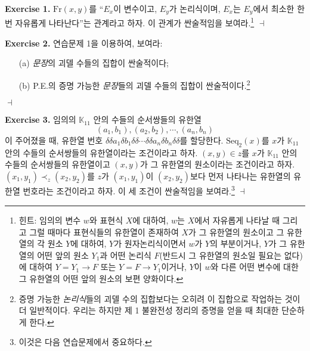 \documentclass[12pt]{paper}
\newenvironment{context}[1][]
{ \noindent \textbf{{#1}.} }
{ \hfill $ \dashv $ }
\begin{document}
\begin{context}[Exercise 1]
$\mathrm{Fr} \left( x , y \right)$를 ``$E_x$이 변수이고, $E_y$가 논리식이며, $E_x$는 $E_y$에서 최소한 한 번 자유롭게 나타난다''는 관계라고 하자.
이 관계가 싼술적임을 보여라.\footnote
{
힌트: 임의의 변수 $w$와 표현식 $X$에 대하여,
$w$는 $X$에서 자유롭게 나타날 때 그리고 그럴 때마다
표현식들의 유한열이 존재하여 $X$가 그 유한열의 원소이고 그 유한열의 각 원소 $Y$에 대하여,
$Y$가 원자논리식이면서 $w$가 $Y$의 부분이거나,
$Y$가 그 유한열의 어떤 앞의 원소 $Y_1$과 어떤 논리식 $F$(반드시 그 유한열의 원소일 필요는 없다)에 대하여 $Y = Y_1 \rightarrow F$ 또는 $Y = F \rightarrow Y_1$이거나,
$Y$이 $w$와 다른 어떤 변수에 대한 그 유한열의 어떤 앞의 원소의 보편 양화이다.
}
\end{context}

\begin{context}[Exercise 2]
연습문제 1을 이용하여, 보여라:
\begin{enumerate}
\item[(a)] \textit{문장}의 괴델 수들의 집합이 싼술적이다;
\item[(b)] P.E.의 증명 가능한 \textit{문장}들의 괴델 수들의 집합이 싼술적이다.\footnote
{
증명 가능한 \textit{논리식}들의 괴델 수의 집합보다는 오히려 이 집합으로 작업하는 것이 더 일반적이다.
우리는 하지만 제 1 불완전성 정리의 증명을 얻을 때 최대한 단순하게 한다.
}
\end{enumerate}
\end{context}

\begin{context}[Exercise 3]
임의의 $\mathbb{K}_{11}$ 안의 수들의 순서쌍들의 유한열 $$\left( a_1 , b_1 \right) , \left( a_2 , b_2 \right) , \cdots , \left( a_n , b_n \right)$$이 주어졌을 때,
유한열 번호 $\delta \delta a_1 \delta b_1 \delta\delta \cdots \delta \delta a_n \delta b_n \delta \delta$를 할당한다.
$\mathrm{Seq}_2 \left( x \right)$를 $x$가 $\mathbb{K}_{11}$ 안의 수들의 순서쌍들의 유한열이라는 조건이라고 하자.
$ \left( x , y \right) \in z $를 $x$가 $\mathbb{K}_{11}$ 안의 수들의 순서쌍들의 유한열이고
$ \left( x , y \right) $가 그 유한열의 원소이라는 조건이라고 하자.
$ \left( x_1 , y_1 \right) \prec_{z} \left( x_2 , y_2 \right) $를
$z$가 $\left( x_1 , y_1 \right)$이 $\left( x_2 , y_2 \right)$보다
먼저 나타나는 유한열의 유한열 번호라는 조건이라고 하자.
이 세 조건이 싼술적임을 보여라.\footnote
{
이것은 다음 연습문제에서 중요하다.
}
\end{context}
\end{document}
